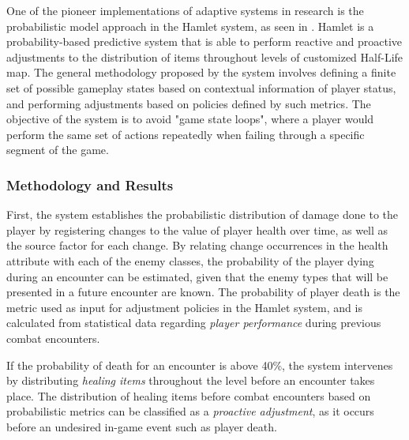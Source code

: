 
One of the pioneer implementations of adaptive systems in research is the probabilistic model approach in the Hamlet system, as seen in \citet{article_casefordynamicdifficulty}. Hamlet is a probability-based predictive system that is able to perform reactive and proactive adjustments to the distribution of items throughout levels of customized Half-Life  map. The general methodology proposed by the system involves defining a finite set of possible gameplay states based on contextual information of player status, and performing adjustments based on policies defined by such metrics. The objective of the system is to avoid "game state loops", where a player would perform the same set of actions repeatedly when failing through a specific segment of the game.

\subsubsection{Methodology and Results} 

First, the system establishes the probabilistic distribution of damage done to the player by registering changes to the value of player health over time, as well as the source factor for each change. By relating change occurrences in the health attribute with each of the enemy classes, the probability of the player dying during an encounter can be estimated, given that the enemy types that will be presented in a future encounter are known. The probability of player death is the metric used as input for adjustment policies in the Hamlet system, and is calculated from statistical data regarding \emph{player performance} during previous combat encounters.

If the probability of death for an encounter is above 40\%, the system intervenes by distributing \emph{healing items} throughout the level before an encounter takes place. The distribution of healing items before combat encounters based on probabilistic metrics can be classified as a \emph{proactive adjustment}, as it occurs before an undesired in-game event such as player death.

